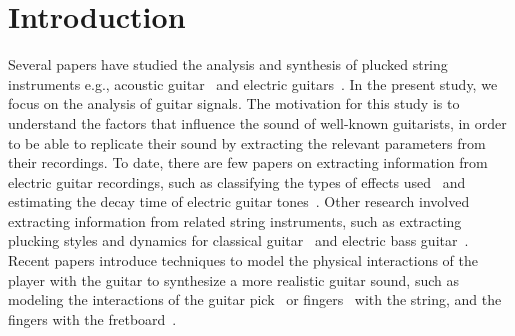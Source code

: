 \documentclass{article}
\begin{document}
\section{Introduction} %
\label{sec:introduction}
\vspace{-.6mm}
%
Several papers have studied the analysis and synthesis of plucked string instruments e.g., acoustic guitar~\cite{Karjalainen93towardshigh-quality,laurson2001methods} and electric guitars~\cite{sullivan1990extending}. In the present study, we focus on the analysis of guitar signals. The motivation for this study is to understand the factors that influence the sound of well-known guitarists, in order to be able to replicate their sound by extracting the relevant parameters from their recordings. 
To date, there are few papers on extracting information from electric guitar recordings, such as classifying the types of effects used~\cite{abesser2012feature} and estimating the decay time of electric guitar tones~\cite{pate2014predicting}. Other research involved extracting information from related string instruments, such as extracting plucking styles and dynamics for classical guitar~\cite{erkut2000extraction} and electric bass guitar~\cite{abesser:automatic_string_detection_ml}. Recent papers introduce techniques to model the physical interactions of the player with the guitar to synthesize a more realistic guitar sound, such as modeling the interactions of the guitar pick~\cite{germain2009synthesis,evangelista2010player} or fingers~\cite{poirot_nonlinear_interactions_with_string} with the string, and the fingers with the fretboard~\cite{bilbao2015numerical}.
\end{document}
